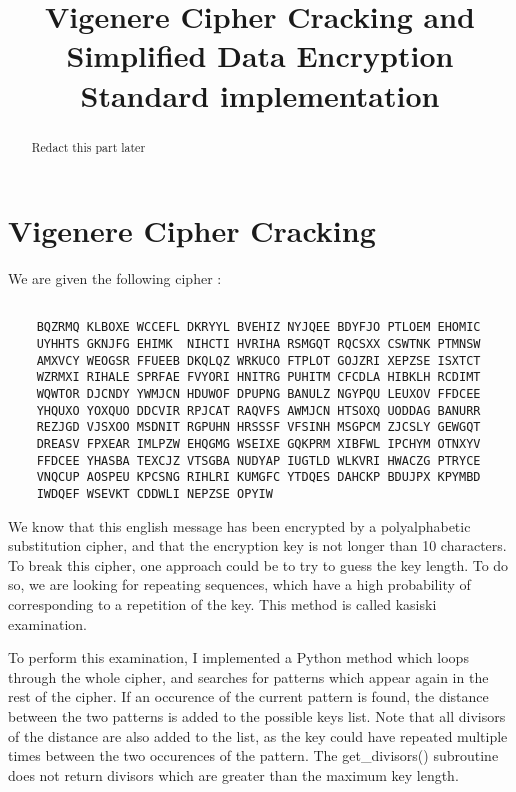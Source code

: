 \documentclass{article}
\title{\textbf{Vigenere Cipher Cracking and Simplified Data Encryption Standard implementation}}
\author{}
\date{}
\begin{document}
\maketitle \thispagestyle{fancy}

\begin{abstract}
    Redact this part later
    
\end{abstract}

\section{Vigenere Cipher Cracking} \label{vignere}

We are given the following cipher :

\begin{verbatim}

    BQZRMQ KLBOXE WCCEFL DKRYYL BVEHIZ NYJQEE BDYFJO PTLOEM EHOMIC
    UYHHTS GKNJFG EHIMK  NIHCTI HVRIHA RSMGQT RQCSXX CSWTNK PTMNSW
    AMXVCY WEOGSR FFUEEB DKQLQZ WRKUCO FTPLOT GOJZRI XEPZSE ISXTCT
    WZRMXI RIHALE SPRFAE FVYORI HNITRG PUHITM CFCDLA HIBKLH RCDIMT
    WQWTOR DJCNDY YWMJCN HDUWOF DPUPNG BANULZ NGYPQU LEUXOV FFDCEE
    YHQUXO YOXQUO DDCVIR RPJCAT RAQVFS AWMJCN HTSOXQ UODDAG BANURR
    REZJGD VJSXOO MSDNIT RGPUHN HRSSSF VFSINH MSGPCM ZJCSLY GEWGQT
    DREASV FPXEAR IMLPZW EHQGMG WSEIXE GQKPRM XIBFWL IPCHYM OTNXYV
    FFDCEE YHASBA TEXCJZ VTSGBA NUDYAP IUGTLD WLKVRI HWACZG PTRYCE
    VNQCUP AOSPEU KPCSNG RIHLRI KUMGFC YTDQES DAHCKP BDUJPX KPYMBD
    IWDQEF WSEVKT CDDWLI NEPZSE OPYIW

\end{verbatim}

We know that this english message has been encrypted by a polyalphabetic substitution cipher, and that the encryption key is not longer than 10 characters. To break this cipher, one approach could be to try to guess the key length. To do so, we are looking for repeating sequences, which have a high probability of corresponding to a repetition of the key. This method is called kasiski examination.\cite{vigenere}

To perform this examination, I implemented a Python method which loops through the whole cipher, and searches for patterns which appear again in the rest of the cipher. If an occurence of the current pattern is found, the distance between the two patterns is added to the possible keys list. Note that all divisors of the distance are also added to the list, as the key could have repeated multiple times between the two occurences of the pattern. The get\_divisors() subroutine does not return divisors which are greater than the maximum key length.
\bigskip
\end{document}
